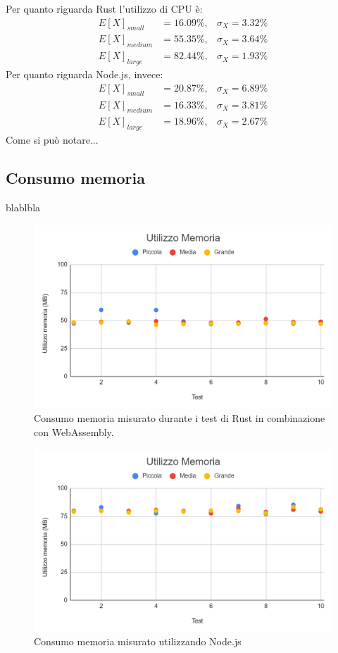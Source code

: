 Per quanto riguarda Rust l'utilizzo di CPU è:
\begin{align*}
    E[X]_{small}&=16.09\%,  & \sigma_X=3.32\%\\
    E[X]_{medium}&=55.35\%, & \sigma_X=3.64\%\\
    E[X]_{large}&=82.44\%,  & \sigma_X=1.93\%
\end{align*}
Per quanto riguarda Node.js, invece:
\begin{align*}
    E[X]_{small}&=20.87\%,  & \sigma_X=6.89\%\\
    E[X]_{medium}&=16.33\%, & \sigma_X=3.81\%\\
    E[X]_{large}&=18.96\%,  & \sigma_X=2.67\%
\end{align*}
Come si può notare...
\subsection{Consumo memoria}
blablbla
\begin{figure}
    \begin{center}
            \includegraphics[width=1\columnwidth]{images/rust_mem.png}
    \end{center}
    \caption{Consumo memoria misurato durante i test di Rust in combinazione con WebAssembly.}
\end{figure}
\begin{figure}
    \begin{center}
            \includegraphics[width=1\columnwidth]{images/node_mem.png}
    \end{center}
    \caption{Consumo memoria misurato utilizzando Node.js}
\end{figure}

